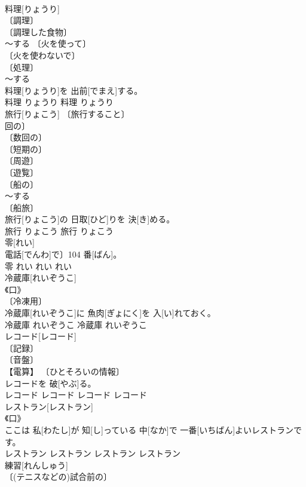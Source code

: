\documentclass[8pt]{extreport}
\begin{document}
\begin{CJK}{UTF8}{min}
\\	料理[りょうり]	
\\	〔調理〕 
\\	〔調理した食物〕 
\\	～する 〔火を使って〕 
\\	〔火を使わないで〕 
\\	〔処理〕 
\\	～する 
\\	料理[りょうり]を 出前[でまえ]する。	
\\	料理	りょうり	料理	りょうり	
\\	旅行[りょこう]	〔旅行すること〕 
\\	回の〕 
\\	〔数回の〕 
\\	〔短期の〕 
\\	〔周遊〕 
\\	〔遊覧〕 
\\	〔船の〕 
\\	～する 
\\	〔船旅〕 
\\	旅行[りょこう]の 日取[ひど]りを 決[き]める。	
\\	旅行	りょこう	旅行	りょこう	
\\	零[れい]	
\\	電話[でんわ]で〕104 番[ばん]。	
\\	零	れい	れい	れい	
\\	冷蔵庫[れいぞうこ]	
\\	《口》 
\\	〔冷凍用〕 
\\	冷蔵庫[れいぞうこ]に 魚肉[ぎょにく]を 入[い]れておく。	
\\	冷蔵庫	れいぞうこ	冷蔵庫	れいぞうこ	
\\	レコード[レコード]	
\\	〔記録〕 
\\	〔音盤〕 
\\	【電算】 〔ひとそろいの情報〕 
\\	レコードを 破[やぶ]る。	
\\	レコード	レコード	レコード	レコード	
\\	レストラン[レストラン]	
\\	《口》 
\\	ここは 私[わたし]が 知[し]っている 中[なか]で 一番[いちばん]よいレストランです。	
\\	レストラン	レストラン	レストラン	レストラン	
\\	練習[れんしゅう]	
\\	〔(テニスなどの)試合前の〕 

\end{CJK}
\end{document}
